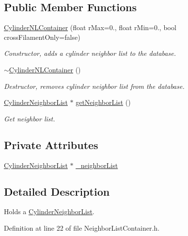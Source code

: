 \subsection*{Public Member Functions}
\begin{DoxyCompactItemize}
\item 
\hyperlink{classCylinderNLContainer_ac6f9fad451123b8d26bfce5e9649987b}{Cylinder\+N\+L\+Container} (float r\+Max=0., float r\+Min=0., bool cross\+Filament\+Only=false)
\begin{DoxyCompactList}\small\item\em Constructor, adds a cylinder neighbor list to the database. \end{DoxyCompactList}\item 
\hyperlink{classCylinderNLContainer_a9d61168b2490efa03d6191c8848b2b3e}{$\sim$\+Cylinder\+N\+L\+Container} ()
\begin{DoxyCompactList}\small\item\em Destructor, removes cylinder neighbor list from the database. \end{DoxyCompactList}\item 
\hyperlink{classCylinderNeighborList}{Cylinder\+Neighbor\+List} $\ast$ \hyperlink{classCylinderNLContainer_afce343b3251cf0ed087cf5a62fb6aaee}{get\+Neighbor\+List} ()
\begin{DoxyCompactList}\small\item\em Get neighbor list. \end{DoxyCompactList}\end{DoxyCompactItemize}
\subsection*{Private Attributes}
\begin{DoxyCompactItemize}
\item 
\hyperlink{classCylinderNeighborList}{Cylinder\+Neighbor\+List} $\ast$ \hyperlink{classCylinderNLContainer_a08bf1bd5d85d517db15ff9f1601eb65e}{\+\_\+neighbor\+List}
\end{DoxyCompactItemize}


\subsection{Detailed Description}
Holds a \hyperlink{classCylinderNeighborList}{Cylinder\+Neighbor\+List}. 

Definition at line 22 of file Neighbor\+List\+Container.\+h.



